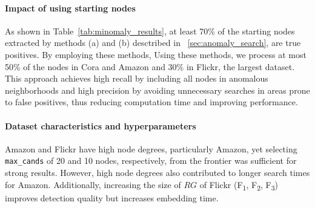 \documentclass[pdflatex,sn-mathphys-num]{sn-jnl}%
\theoremstyle{thmstyleone}%
\theoremstyle{thmstyletwo}%
\theoremstyle{thmstylethree}%
\begin{document}
\paragraph{Impact of using starting nodes}
As shown in Table~\ref{tab:minomaly_results}, at least 70\% of the starting nodes extracted by methods (a) and (b) desctribed in ~\ref{sec:anomaly_search}, are true positives. By employing these methods, Using these methods, we process at most 50\% of the nodes in Cora and Amazon and 30\% in Flickr, the largest dataset. This approach achieves high recall by including all nodes in anomalous neighborhoods and high precision by avoiding unnecessary searches in areas prone to false positives, thus reducing computation time and improving performance.  
\paragraph{Dataset characteristics and hyperparameters}
Amazon and Flickr have high node degrees, particularly Amazon, yet selecting \texttt{max\_cands} of 20 and 10 nodes, respectively, from the frontier was sufficient for strong results. However, high node degrees also contributed to longer search times for Amazon. Additionally, increasing the size of $RG$ of Flickr (F\textsubscript{1}, F\textsubscript{2}, F\textsubscript{3}) improves detection quality  but increases embedding time.

\end{document}
